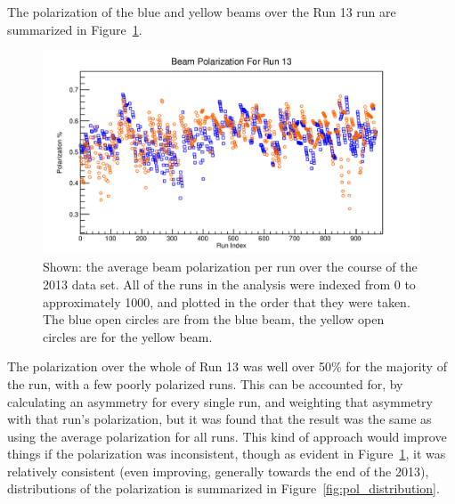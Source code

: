 The polarization of the blue and yellow beams over the Run 13 run are summarized
in Figure~\ref{fig:avg_polarization}.

\begin{figure}[ht]
  \centering
  \includegraphics[width=\linewidth]{./figures/beam_polarization.jpg}
  \caption{
    Shown: the average beam polarization per run over the course of the 2013
    data set. All of the runs in the analysis were indexed from 0 to
    approximately 1000, and plotted in the order that they were taken. The blue
    open circles are from the blue beam, the yellow open circles are for the
    yellow beam.
  }
  \label{fig:avg_polarization}
\end{figure}

The polarization over the whole of Run 13 was well over 50\% for the majority of
the run, with a few poorly polarized runs. This can be accounted for, by
calculating an asymmetry for every single run, and weighting that asymmetry with
that run's polarization, but it was found that the result was the same as using
the average polarization for all runs. This kind of approach would improve
things if the polarization was inconsistent, though as evident in
Figure~\ref{fig:avg_polarization}, it was relatively consistent (even improving,
generally towards the end of the 2013), distributions of the polarization is
summarized in Figure~\ref{fig:pol_distribution}.

